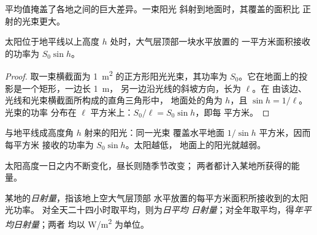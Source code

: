 平均值掩盖了各地之间的巨大差异。一束阳光
斜射到地面时，其覆盖的面积比
正射的光束更大。

\begin{proposition}[水平面上的阳光]\label{prop:g10:earth-energy-budget:height}
太阳位于地平线以上高度 $h$ 处时，大气层顶部一块水平放置的
一平方米面积接收的功率为 $S_0 \sin h$。
\end{proposition}

\begin{proof}
取一束横截面为 \qty{1}{m^2} 的正方形阳光光束，其功率为
$S_0$。它在地面上的投影是一个矩形，一边长 \qty{1}{m}，
另一边沿光线的斜坡方向，长为 $\ell$。在
由该边、光线和光束横截面所构成的直角三角形中，
地面处的角为 $h$，且 $\sin h = 1/\ell$。光束的功率
分布在 $\ell$ 平方米上：$S_0/\ell = S_0 \sin h$，即每
平方米。
\end{proof}

\begin{omfigure}

{\small 与地平线成高度角 $h$ 射来的阳光：同一光束
覆盖水平地面 $1/\sin h$ 平方米，因而每平方米
接收的功率为 $S_0 \sin h$。太阳越低，
地面上的阳光就越弱。}
\end{omfigure}

太阳高度一日之内不断变化，昼长则随季节改变；
两者都计入某地所获得的能量。

\begin{definition}[日射量]\label{def:g10:earth-energy-budget:insolation}
某地的\emph{日射量}，指该地上空大气层顶部
水平放置的每平方米面积所接收到的太阳光功率。
对全天二十四小时取平均，则为\emph{日平均
日射量}；对全年取平均，得\emph{年平均日射量}；两者
均以 \unit{W/m^2} 为单位。
\end{definition}


